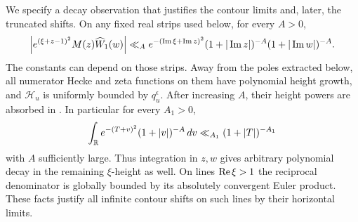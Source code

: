 We specify a decay observation that justifies the contour limits and,
later, the truncated shifts.  On any fixed real strips used below, for
every \(A>0\),
\begin{equation}
 \left|e^{(\xi+z-1)^2}M(z)\widehat W_1(w)\right|
 \ll_A e^{-(\operatorname{Im}\xi+\operatorname{Im} z)^2}
          (1+|\operatorname{Im} z|)^{-A}(1+|\operatorname{Im} w|)^{-A}.
\label{eq:triple-height-decay}
\end{equation}
The constants can depend on those strips.  Away from the poles extracted
below, all numerator Hecke and zeta functions on them have polynomial height growth, and
\(\mathcal H_u\) is uniformly bounded by \(q_u^\epsilon\).
After increasing \(A\), their height powers are absorbed in
.  In particular for every \(A_1>0\),
\[
 \int_{\mathbb{R}}e^{-(T+v)^2}(1+|v|)^{-A}\,dv
          \ll_{A_1}(1+|T|)^{-A_1}
\]
with \(A\) sufficiently large.  Thus integration in \(z,w\) gives
arbitrary polynomial decay in the remaining \(\xi\)-height as well.
On lines \(\operatorname{Re}\xi>1\) the reciprocal denominator is globally bounded
by its absolutely convergent Euler product.  These facts justify all
infinite contour shifts on such lines by their horizontal limits.

